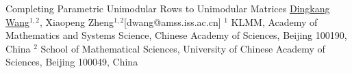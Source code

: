 

\newcommand{\GM}[1]{{\color{red} \textbf{GM:} #1}}


\begin{abstract_online}{Completing Parametric Unimodular Rows to Unimodular Matrices}{%
        \underline{Dingkang Wang}$^{1,2}$, Xiaopeng Zheng$^{1,2}$}{[dwang@amss.iss.ac.cn]
        }{%
        $^1$ KLMM, Academy of Mathematics and Systems Science, Chinese Academy of Sciences, Beijing 100190, China \newline{}$^2$ School of Mathematical Sciences, University of Chinese Academy of Sciences, Beijing 100049, China\newline{}}





\end{abstract_online}
